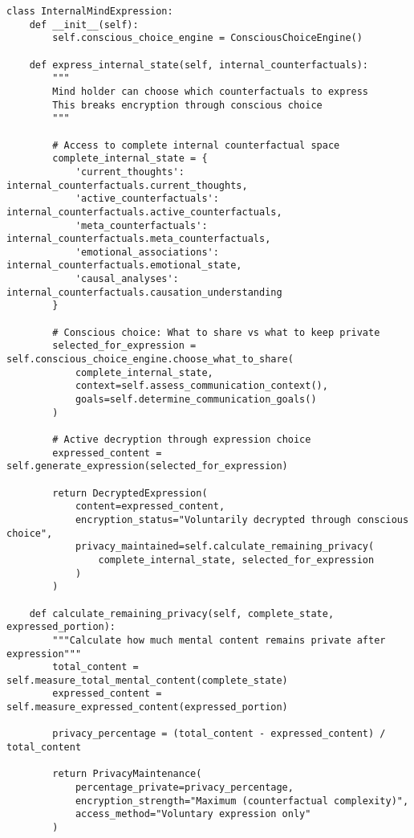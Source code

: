 \documentclass[12pt,a4paper]{article}
\begin{document}
\begin{lstlisting}[style=pythonstyle, caption=Why Internal Expression Is Open Through Choice]
class InternalMindExpression:
    def __init__(self):
        self.conscious_choice_engine = ConsciousChoiceEngine()
        
    def express_internal_state(self, internal_counterfactuals):
        """
        Mind holder can choose which counterfactuals to express
        This breaks encryption through conscious choice
        """
        
        # Access to complete internal counterfactual space
        complete_internal_state = {
            'current_thoughts': internal_counterfactuals.current_thoughts,
            'active_counterfactuals': internal_counterfactuals.active_counterfactuals,
            'meta_counterfactuals': internal_counterfactuals.meta_counterfactuals,
            'emotional_associations': internal_counterfactuals.emotional_state,
            'causal_analyses': internal_counterfactuals.causation_understanding
        }
        
        # Conscious choice: What to share vs what to keep private
        selected_for_expression = self.conscious_choice_engine.choose_what_to_share(
            complete_internal_state,
            context=self.assess_communication_context(),
            goals=self.determine_communication_goals()
        )
        
        # Active decryption through expression choice
        expressed_content = self.generate_expression(selected_for_expression)
        
        return DecryptedExpression(
            content=expressed_content,
            encryption_status="Voluntarily decrypted through conscious choice",
            privacy_maintained=self.calculate_remaining_privacy(
                complete_internal_state, selected_for_expression
            )
        )
        
    def calculate_remaining_privacy(self, complete_state, expressed_portion):
        """Calculate how much mental content remains private after expression"""
        total_content = self.measure_total_mental_content(complete_state)
        expressed_content = self.measure_expressed_content(expressed_portion)
        
        privacy_percentage = (total_content - expressed_content) / total_content
        
        return PrivacyMaintenance(
            percentage_private=privacy_percentage,
            encryption_strength="Maximum (counterfactual complexity)",
            access_method="Voluntary expression only"
        )
\end{lstlisting}
\end{document}
